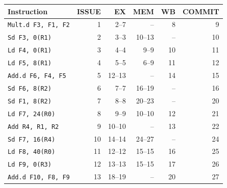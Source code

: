 \begin{tabular}{@{}lrrrrr@{}}\toprule
Instruction & ISSUE & EX & MEM & WB & COMMIT\\\midrule
\texttt{Mult.d F3, F1, F2} & 1 & 2--7 & -- & 8 & 9 \\
\texttt{Sd F3, 0(R1)} & 2 & 3--3 & 10--13 & -- & 10 \\
\texttt{Ld F4, 0(R1)} & 3 & 4--4 & 9--9 & 10 & 11 \\
\texttt{Ld F5, 8(R1)} & 4 & 5--5 & 6--9 & 11 & 12 \\
\texttt{Add.d F6, F4, F5} & 5 & 12--13 & -- & 14 & 15 \\
\texttt{Sd F6, 8(R2)} & 6 & 7--7 & 16--19 & -- & 16 \\
\texttt{Sd F1, 8(R2)} & 7 & 8--8 & 20--23 & -- & 20 \\
\texttt{Ld F7, 24(R0)} & 8 & 9--9 & 10--10 & 12 & 21 \\
\texttt{Add R4, R1, R2} & 9 & 10--10 & -- & 13 & 22 \\
\texttt{Sd F7, 16(R4)} & 10 & 14--14 & 24--27 & -- & 24 \\
\texttt{Ld F8, 40(R0)} & 11 & 12--12 & 15--15 & 16 & 25 \\
\texttt{Ld F9, 0(R3)} & 12 & 13--13 & 15--15 & 17 & 26 \\
\texttt{Add.d F10, F8, F9} & 13 & 18--19 & -- & 20 & 27 \\
\bottomrule\end{tabular}